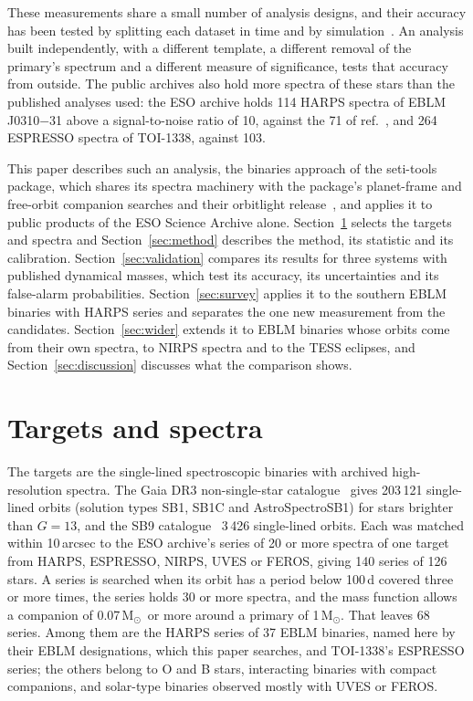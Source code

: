 \documentclass[3p,11pt]{elsarticle}
\newcommand{\Msun}{M$_\odot$}
\begin{document}
These measurements share a small number of analysis designs, and their accuracy has been tested
by splitting each dataset in time and by simulation~\cite{Sebastian2024b,Stevenson2026}. An
analysis built independently, with a different template, a different removal of the primary's
spectrum and a different measure of significance, tests that accuracy from outside. The public
archives also hold more spectra of these stars than the published analyses used: the ESO archive
holds 114 HARPS spectra of EBLM J0310$-$31 above a signal-to-noise ratio of 10, against the 71 of
ref.~\cite{Stevenson2026}, and 264 ESPRESSO spectra of TOI-1338, against 103.

This paper describes such an analysis, the binaries approach of the seti-tools package, which
shares its spectra machinery with the package's planet-frame and free-orbit companion searches and
their orbitlight release~\cite{orbitlight}, and applies it to public products of the ESO Science
Archive alone. Section~\ref{sec:data} selects the targets and spectra and
Section~\ref{sec:method} describes the method, its statistic and its calibration.
Section~\ref{sec:validation} compares its results for three systems with published dynamical
masses, which test its accuracy, its uncertainties and its false-alarm probabilities.
Section~\ref{sec:survey} applies it to the southern EBLM binaries with HARPS series and separates
the one new measurement from the candidates. Section~\ref{sec:wider} extends it to EBLM binaries
whose orbits come from their own spectra, to NIRPS spectra and to the TESS eclipses, and
Section~\ref{sec:discussion} discusses what the comparison shows.

\section{Targets and spectra}\label{sec:data}

The targets are the single-lined spectroscopic binaries with archived high-resolution spectra.
The Gaia DR3 non-single-star catalogue~\cite{GaiaNSS2023} gives 203\,121 single-lined orbits
(solution types SB1, SB1C and AstroSpectroSB1) for stars brighter than $G = 13$, and the SB9
catalogue~\cite{Pourbaix2004} 3\,426 single-lined orbits. Each was matched within
10\,arcsec to the ESO archive's series of 20 or more spectra of one target from HARPS, ESPRESSO,
NIRPS, UVES or FEROS, giving 140 series of 126 stars. A series is searched when its orbit has a
period below 100\,d covered three or more times, the series holds 30 or more spectra, and the
mass function allows a companion of 0.07\,\Msun\ or more around a primary of 1\,\Msun. That
leaves 68 series. Among them are the HARPS series of 37 EBLM binaries, named here by their EBLM
designations, which this paper searches, and TOI-1338's ESPRESSO series; the others belong to O and
B stars, interacting binaries with compact companions, and solar-type binaries observed mostly with
UVES or FEROS.
\end{document}
